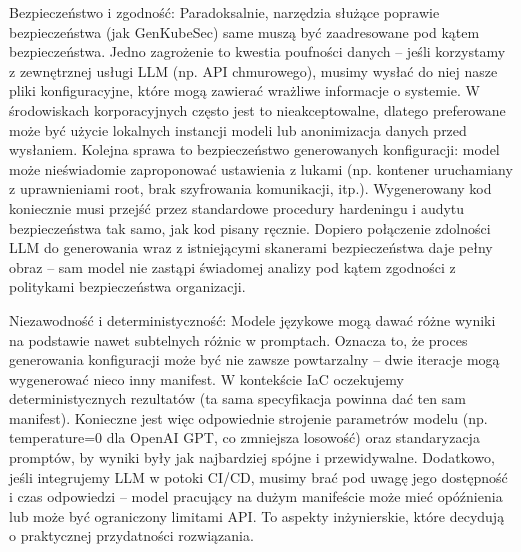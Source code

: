 Bezpieczeństwo i zgodność: Paradoksalnie, narzędzia służące poprawie bezpieczeństwa (jak GenKubeSec) same muszą być zaadresowane pod kątem bezpieczeństwa. Jedno zagrożenie to kwestia poufności danych – jeśli korzystamy z zewnętrznej usługi LLM (np. API chmurowego), musimy wysłać do niej nasze pliki konfiguracyjne, które mogą zawierać wrażliwe informacje o systemie. W środowiskach korporacyjnych często jest to nieakceptowalne, dlatego preferowane może być użycie lokalnych instancji modeli lub anonimizacja danych przed wysłaniem. Kolejna sprawa to bezpieczeństwo generowanych konfiguracji: model może nieświadomie zaproponować ustawienia z lukami (np. kontener uruchamiany z uprawnieniami root, brak szyfrowania komunikacji, itp.). Wygenerowany kod koniecznie musi przejść przez standardowe procedury hardeningu i audytu bezpieczeństwa tak samo, jak kod pisany ręcznie. Dopiero połączenie zdolności LLM do generowania wraz z istniejącymi skanerami bezpieczeństwa daje pełny obraz – sam model nie zastąpi świadomej analizy pod kątem zgodności z politykami bezpieczeństwa organizacji.

Niezawodność i deterministyczność: Modele językowe mogą dawać różne wyniki na podstawie nawet subtelnych różnic w promptach. Oznacza to, że proces generowania konfiguracji może być nie zawsze powtarzalny – dwie iteracje mogą wygenerować nieco inny manifest. W kontekście IaC oczekujemy deterministycznych rezultatów (ta sama specyfikacja powinna dać ten sam manifest). Konieczne jest więc odpowiednie strojenie parametrów modelu (np. temperature=0 dla OpenAI GPT, co zmniejsza losowość) oraz standaryzacja promptów, by wyniki były jak najbardziej spójne i przewidywalne. Dodatkowo, jeśli integrujemy LLM w potoki CI/CD, musimy brać pod uwagę jego dostępność i czas odpowiedzi – model pracujący na dużym manifeście może mieć opóźnienia lub może być ograniczony limitami API. To aspekty inżynierskie, które decydują o praktycznej przydatności rozwiązania.


